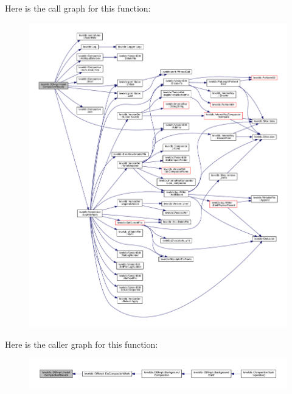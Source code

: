 Here is the call graph for this function\+:\nopagebreak
\begin{figure}[H]
\begin{center}
\leavevmode
\includegraphics[width=350pt]{classleveldb_1_1_d_b_impl_a7cebf4ac69be05d4f9e7f876d42897b0_cgraph}
\end{center}
\end{figure}




Here is the caller graph for this function\+:\nopagebreak
\begin{figure}[H]
\begin{center}
\leavevmode
\includegraphics[width=350pt]{classleveldb_1_1_d_b_impl_a7cebf4ac69be05d4f9e7f876d42897b0_icgraph}
\end{center}
\end{figure}


\hypertarget{classleveldb_1_1_d_b_impl_a1138a932779473e7b0cbf70078583508}{}
